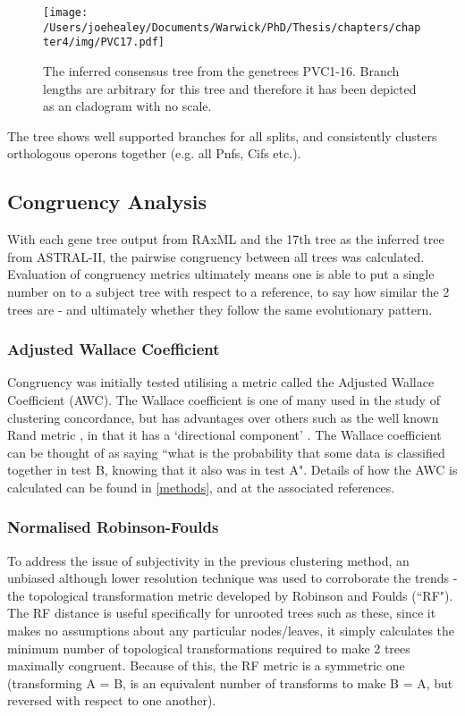 \vspace{1cm}
\begin{figure}[h!]
	\centering
	\texttt{[image: /Users/joehealey/Documents/Warwick/PhD/Thesis/chapters/chapter4/img/PVC17.pdf]}
	\captionsetup{singlelinecheck=off, justification=justified, font=footnotesize, aboveskip=19pt}
	\caption[Consensus Tree]{The inferred consensus tree from the genetrees PVC1-16. Branch lengths are arbitrary for this tree and therefore it has been depicted as an cladogram with no scale.}
	\label{consensustree}
\end{figure}

The tree shows well supported branches for all splits, and consistently clusters orthologous operons together (e.g. all Pnfs, Cifs etc.).


\subsection{Congruency Analysis}
	With each gene tree output from RAxML and the 17th tree as the inferred tree from ASTRAL-II, the pairwise congruency between all trees was calculated. Evaluation of congruency metrics ultimately means one is able to put a single number on to a subject tree with respect to a reference, to say how similar the 2 trees are - and ultimately whether they follow the same evolutionary pattern.
	
\subsubsection{Adjusted Wallace Coefficient}
	Congruency was initially tested utilising a metric called the Adjusted Wallace Coefficient (AWC). The Wallace coefficient is one of many used in the study of clustering concordance, but has advantages over others such as the well known Rand metric \citep{Rand1971}, in that it has a `directional component' \citep{Wallace1983}. The Wallace coefficient can be thought of as saying ``what is the probability that some data is classified together in test B, knowing that it also was in test A". Details of how the AWC is calculated can be found in \vref{methods}, and at the associated references.

\subsubsection{Normalised Robinson-Foulds}
	To address the issue of subjectivity in the previous clustering method, an unbiased although lower resolution technique was used to corroborate the trends - the topological transformation metric developed by Robinson and Foulds (``RF")\citep{Robinson1981}. The RF distance is useful specifically for unrooted trees such as these, since it makes no assumptions about any particular nodes/leaves, it simply calculates the minimum number of topological transformations required to make 2 trees maximally congruent.  Because of this, the RF metric is a symmetric one (transforming A = B, is an equivalent number of transforms to make B = A, but reversed with respect to one another). 
	
